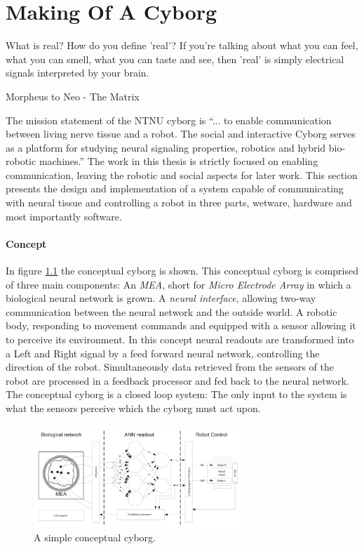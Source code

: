 \chapter{Making Of A Cyborg}
\epigraph{What is real? How do you define 'real'? If you're talking about what
you can feel, what you can smell, what you can taste and see, then 'real' is
simply electrical signals interpreted by your brain.}
{Morpheus to Neo - The Matrix}
The mission statement of the NTNU cyborg is ``... to enable communication
between living nerve tissue and a robot. The social and interactive Cyborg
serves as a platform for studying neural signaling properties, robotics and
hybrid bio-robotic machines.'' \cite{ntnu_cyborg}
The work in this thesis is strictly focused on enabling communication, leaving
the robotic and social aspects for later work.
This section presents the design and implementation of a system capable of
communicating with neural tissue and controlling a robot in three parts,
wetware, hardware and most importantly software.
\subsubsection{Concept}
In figure \ref{figOverviewSimple} the conceptual cyborg is shown.
This conceptual cyborg is comprised of three main components: An \emph{MEA}, short
for \emph{Micro Electrode Array} in which a biological neural network is grown.
A \emph{neural interface}, allowing two-way communication between the neural network and
the outside world.
A robotic body, responding to movement commands and equipped with a sensor
allowing it to perceive its environment.
In this concept neural readouts are transformed into a Left and Right signal by
a feed forward neural network, controlling the direction of the robot.
Simultaneously data retrieved from the sensors of the robot are processed in a
feedback processor and fed back to the neural network.
The conceptual cyborg is a closed loop system: The only input to the system is
what the sensors perceive which the cyborg must act upon.
\begin{figure}[h!]
  \centering
  \includegraphics[width=0.7\textwidth]{fig/cyborg_overview.png}
  \caption{A simple conceptual cyborg.}
  \label{figOverviewSimple}
\end{figure}
